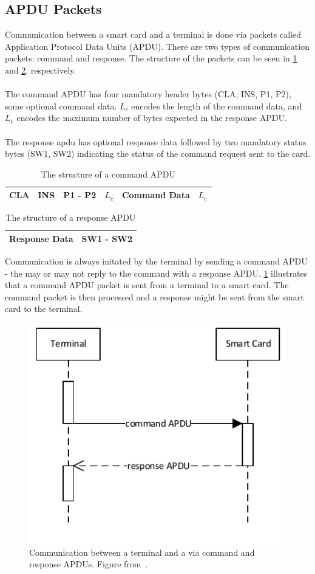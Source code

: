 \subsection{APDU Packets}\label{subsec:apdu}
Communication between a smart card and a terminal is done via packets called Application Protocol Data Units (APDU). There are two types of communication packets: command and response. The structure of the packets can be seen in \cref{tab:apduCommand} and \cref{tab:apduResponse}, respectively.\\\\
The command APDU has four mandatory header bytes (CLA, INS, P1, P2), some optional command data. $L_{c}$ encodes the length of the command data, and $L_{e}$ encodes the maximum number of bytes expected in the response APDU.\\\\
The response apdu has optional response data followed by two mandatory status bytes (SW1, SW2) indicating the status of the command request sent to the card.

\begin{table}[H]
	\centering
    \begin{tabular}{|l|l|l|l|l|l|}
    \hline
    CLA & INS & P1 - P2 & $L_{c}$ & Command Data & $L_{e}$ \\ \hline
    \end{tabular}
    \caption{The structure of a command APDU}
    \label{tab:apduCommand}
\end{table}

\begin{table}[H]
	\centering
    \begin{tabular}{|l|l|}
    \hline
    Response Data & SW1 - SW2 \\ \hline
    \end{tabular}
    \caption{The structure of a response APDU}
    \label{tab:apduResponse}
\end{table}

Communication is always initated by the terminal by sending a command APDU - the \jc may or may not reply to the command with a response APDU. \cref{fig:apdu} illustrates that a command APDU packet is sent from a terminal to a smart card. The command packet is then processed and a response might be sent from the smart card to the terminal.
 
\begin{figure}[H]
  \centering
  \includegraphics[scale=1, trim=0cm 0cm 0cm 0cm]{figures/apdu}
  \caption{Communication between a terminal and a \jc via command and response APDUs. Figure from~\cite[p. 4]{javasec}.}
  \label{fig:apdu}
\end{figure}
